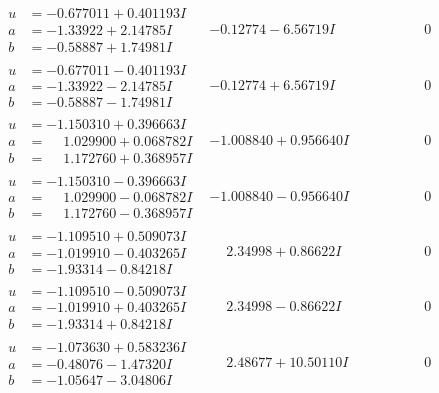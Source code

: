 \documentclass[1p]{elsarticle_modified}
\theoremstyle{definition}
\begin{document}
$$\begin{array}{c|c|c}
\begin{aligned}
u &= -0.677011 + 0.401193 I \\
a &= -1.33922 + 2.14785 I \\
b &= -0.58887 + 1.74981 I\end{aligned}
 & -0.12774 - 6.56719 I & \phantom{-0.000000 } 0 \\ \hline\begin{aligned}
u &= -0.677011 - 0.401193 I \\
a &= -1.33922 - 2.14785 I \\
b &= -0.58887 - 1.74981 I\end{aligned}
 & -0.12774 + 6.56719 I & \phantom{-0.000000 } 0 \\ \hline\begin{aligned}
u &= -1.150310 + 0.396663 I \\
a &= \phantom{-}1.029900 + 0.068782 I \\
b &= \phantom{-}1.172760 + 0.368957 I\end{aligned}
 & -1.008840 + 0.956640 I & \phantom{-0.000000 } 0 \\ \hline\begin{aligned}
u &= -1.150310 - 0.396663 I \\
a &= \phantom{-}1.029900 - 0.068782 I \\
b &= \phantom{-}1.172760 - 0.368957 I\end{aligned}
 & -1.008840 - 0.956640 I & \phantom{-0.000000 } 0 \\ \hline\begin{aligned}
u &= -1.109510 + 0.509073 I \\
a &= -1.019910 - 0.403265 I \\
b &= -1.93314 - 0.84218 I\end{aligned}
 & \phantom{-}2.34998 + 0.86622 I & \phantom{-0.000000 } 0 \\ \hline\begin{aligned}
u &= -1.109510 - 0.509073 I \\
a &= -1.019910 + 0.403265 I \\
b &= -1.93314 + 0.84218 I\end{aligned}
 & \phantom{-}2.34998 - 0.86622 I & \phantom{-0.000000 } 0 \\ \hline\begin{aligned}
u &= -1.073630 + 0.583236 I \\
a &= -0.48076 - 1.47320 I \\
b &= -1.05647 - 3.04806 I\end{aligned}
 & \phantom{-}2.48677 + 10.50110 I & \phantom{-0.000000 } 0 \\ \hline\begin{aligned}

\end{aligned}
\end{array}$$
\end{document}
